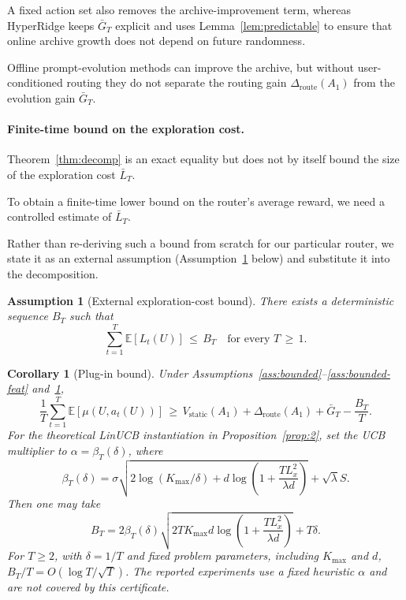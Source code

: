 \documentclass{article} %
\newtheorem{corollary}[theorem]{Corollary}
\newtheorem{assumption}{Assumption}
\providecommand{\E}{\mathbb{E}}
\begin{document}
A fixed action set also removes the archive-improvement term, whereas HyperRidge keeps $\bar G_T$ explicit and uses Lemma~\ref{lem:predictable} to ensure that online archive growth does not depend on future randomness.

Offline prompt-evolution methods can improve the archive, but without user-conditioned routing they do not separate the routing gain $\Delta_{\mathrm{route}}(A_1)$ from the evolution gain $\bar G_T$.

\paragraph{Finite-time bound on the exploration cost.}

\label{sec:method-plugin}

Theorem~\ref{thm:decomp} is an exact equality but does not by itself bound the size of the exploration cost $\bar L_T$.

To obtain a finite-time lower bound on the router's average reward, we need a controlled estimate of $\bar L_T$.

Rather than re-deriving such a bound from scratch for our particular router, we state it as an external assumption (Assumption~\ref{ass:Bt} below) and substitute it into the decomposition.

\begin{assumption}[External exploration-cost bound]
\label{ass:Bt}
There exists a deterministic sequence $B_T$ such that
\begin{equation}
\label{eq:ass-Bt}
\sum_{t=1}^T \E[L_t(U)] \,\le\, B_T \quad \text{for every } T \,\ge\, 1.
\end{equation}
\end{assumption}

\begin{corollary}[Plug-in bound]
\label{cor:plugin}
Under Assumptions~\ref{ass:bounded}--\ref{ass:bounded-feat} and~\ref{ass:Bt},
\begin{equation}
\label{eq:cor-plugin}
\frac{1}{T}\sum_{t=1}^T \E[\mu(U, a_t(U))]
\,\ge\, V_{\mathrm{static}}(A_1) + \Delta_{\mathrm{route}}(A_1) + \bar G_T - \frac{B_T}{T}.
\end{equation}
For the theoretical LinUCB instantiation in Proposition~\ref{prop:2}, set the UCB multiplier to $\alpha=\beta_T(\delta)$, where
\begin{equation}
\label{eq:cor-plugin-beta}
\beta_T(\delta)
=
\sigma\sqrt{2\log(K_{\max}/\delta)
+d\log\!\left(1+\frac{TL_x^2}{\lambda d}\right)}
+\sqrt{\lambda}S.
\end{equation}
Then one may take
\begin{equation}
\label{eq:cor-plugin-rate}
B_T
=
2\beta_T(\delta)
\sqrt{2TK_{\max}d
\log\!\left(1+\frac{TL_x^2}{\lambda d}\right)}
+T\delta.
\end{equation}
For \(T\ge2\), with \(\delta=1/T\) and fixed problem parameters, including \(K_{\max}\) and
\(d\), \(B_T/T=O(\log T/\sqrt T)\). The reported experiments use a fixed
heuristic \(\alpha\) and are not covered by this certificate.
\end{corollary}
\end{document}
